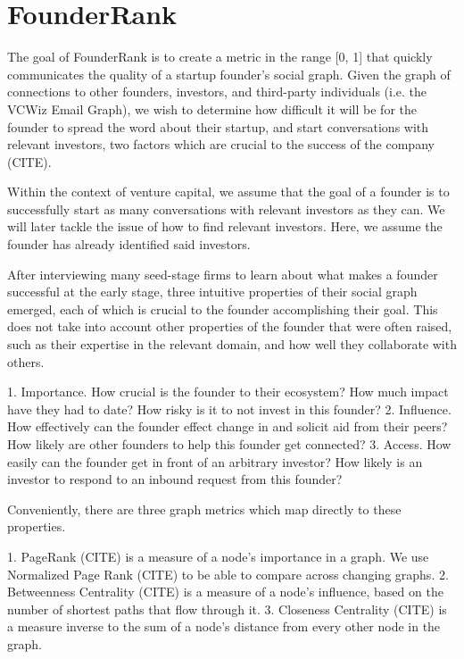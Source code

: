 \section{FounderRank}

The goal of FounderRank is to create a metric in the range [0, 1] that quickly communicates the quality of a startup founder's social graph. Given the graph of connections to other founders, investors, and third-party individuals (i.e. the VCWiz Email Graph), we wish to determine how difficult it will be for the founder to spread the word about their startup, and start conversations with relevant investors, two factors which are crucial to the success of the company (CITE).

Within the context of venture capital, we assume that the goal of a founder is to successfully start as many conversations with relevant investors as they can. We will later tackle the issue of how to find relevant investors. Here, we assume the founder has already identified said investors.

After interviewing many seed-stage firms to learn about what makes a founder successful at the early stage, three intuitive properties of their social graph emerged, each of which is crucial to the founder accomplishing their goal. This does not take into account other properties of the founder that were often raised, such as their expertise in the relevant domain, and how well they collaborate with others.

  1. Importance. How crucial is the founder to their ecosystem? How much impact have they had to date? How risky is it to not invest in this founder?
  2. Influence. How effectively can the founder effect change in and solicit aid from their peers? How likely are other founders to help this founder get connected?
  3. Access. How easily can the founder get in front of an arbitrary investor? How likely is an investor to respond to an inbound request from this founder?

Conveniently, there are three graph metrics which map directly to these properties.

  1. PageRank (CITE) is a measure of a node's importance in a graph. We use Normalized Page Rank (CITE) to be able to compare across changing graphs.
  2. Betweenness Centrality (CITE) is a measure of a node's influence, based on the number of shortest paths that flow through it.
  3. Closeness Centrality (CITE) is a measure inverse to the sum of a node's distance from every other node in the graph.

